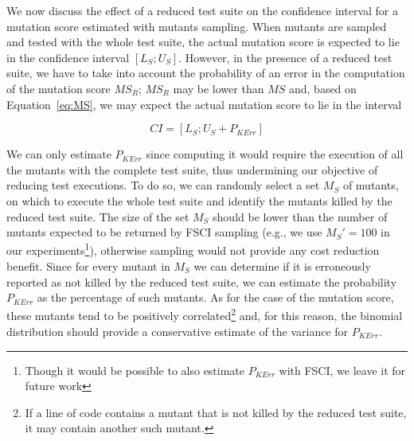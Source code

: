  {We now discuss the effect of a reduced test suite on the confidence interval for a mutation score estimated with mutants sampling. When mutants are sampled and tested with the whole test suite, the actual mutation score is expected to lie in the confidence interval $[\mathit{L}_{S};\mathit{U}_{S}]$. 
However, in the presence of a reduced test suite, we have to take into account the probability of an error in the computation of the mutation score $\mathit{MS}_R$;  $\mathit{MS}_R$ may be lower than $\mathit{MS}$ and, based on Equation~\ref{eq:MS}, we may expect the actual mutation score to lie in the interval}

\begin{equation}
\label{eq:CI}
\mathit{CI}=[\mathit{L}_{S};\mathit{U}_{S}+P_{\mathit{KErr}}]
\end{equation}

 {We can only estimate  $P_{\mathit{KErr}}$ since computing it would require the execution of all the mutants with the complete test suite, thus undermining our objective of reducing test executions. 
To do so, we can randomly select a set $M_S$ of mutants, on which to execute the whole test suite and identify the mutants killed by the reduced test suite. %
The size of the set $M_S$ should be lower than the number of mutants expected to be returned by FSCI sampling (e.g., we use $M_S'=100$ in our experiments\footnote{Though it would be possible to also estimate $P_{\mathit{KErr}}$ with FSCI, we leave it for future work}), otherwise sampling would not provide any cost reduction benefit.
Since for every mutant in $M_S$ we can determine if it is erroneously reported as not killed by the reduced test suite,
we can 
estimate the probability $P_{\mathit{KErr}}$ as the percentage of such mutants.
As for the case of the mutation score, these mutants tend to be positively  correlated\footnote{If a line of code contains a mutant that is not killed by the reduced test suite, it may contain another such mutant.} and, for this reason, the binomial distribution should provide a conservative estimate of the variance for $P_{\mathit{KErr}}$.} 

